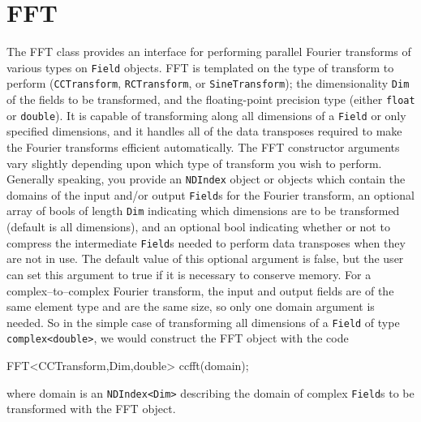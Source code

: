 \chapter{FFT}
\label{sec:fft}

The FFT class provides an interface for performing parallel Fourier transforms of various types on \ippl \texttt{\texttt{Field}} objects. FFT is templated on the type of transform to perform (\texttt{CCTransform}, \texttt{RCTransform}, or \texttt{SineTransform}); the dimensionality \texttt{\texttt{Dim}} of the fields to be transformed, and the floating-point precision type (either \texttt{float} or \texttt{double}). It is capable of transforming along all dimensions of a \texttt{\texttt{Field}} or only specified dimensions, and it handles all of the data transposes required to make the Fourier transforms efficient automatically. The FFT constructor arguments vary slightly depending upon which type of transform you wish to perform. Generally speaking, you provide an {\tt NDIndex} object or objects which contain the domains of the input and/or output \texttt{Field}s for the Fourier transform, an optional array of bools of length \texttt{Dim} indicating which dimensions are to be transformed (default is all dimensions), and an optional bool indicating whether or not to compress the intermediate \texttt{Field}s needed to perform data transposes when they are not in use. The default value of this optional argument is false, but the user can set this argument to true if it is necessary to conserve memory. For a complex--to--complex Fourier transform, the input and output fields are of the same element type and are the same size, so only one domain argument is needed. So in the simple case of transforming all dimensions of a \texttt{Field} of type {\tt complex<double>}, we would construct the FFT object with the code
\begin{smallcode}
FFT<CCTransform,Dim,double> ccfft(domain); 
\end{smallcode}
where domain is an {\tt NDIndex<Dim>} describing the domain of complex \texttt{Field}s to be transformed with the FFT object.
